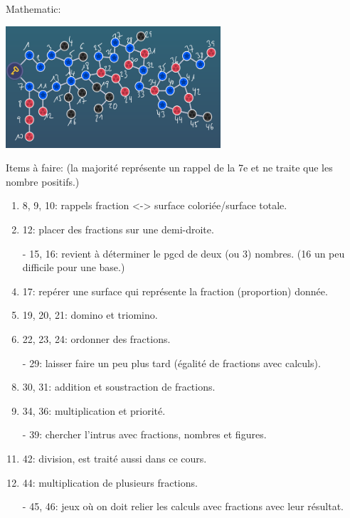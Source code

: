 Mathematic:
\begin{center}
	\includegraphics[width=8cm]{pictures/mathematic_nombres_en_ecriture_fractionnaire}
\end{center}
Items à faire: (la majorité représente un rappel de la 7e et ne traite que les nombre positifs.)
\begin{enumerate}[label=+]
	\item 8, 9, 10: rappels fraction <-> surface coloriée/surface totale.
	\item 12: placer des fractions sur une demi-droite.
	\item[-] 15, 16: revient à déterminer le pgcd de deux (ou 3) nombres. (16 un peu difficile pour une base.)
	\item 17: repérer une surface qui représente la fraction (proportion) donnée.
	\item 19, 20, 21: domino et triomino.
	\item 22, 23, 24: ordonner des fractions.
	\item[-] 29: laisser faire un peu plus tard (égalité de fractions avec calculs).
	\item 30, 31: addition et soustraction de fractions.
	\item 34, 36: multiplication et priorité.
	\item[-] 39: chercher l'intrus avec fractions, nombres et figures.
	\item 42: division, est traité aussi dans ce cours.
	\item 44: multiplication de plusieurs fractions.
	\item[-] 45, 46: jeux où on doit relier les calculs avec fractions avec leur résultat.
\end{enumerate}



